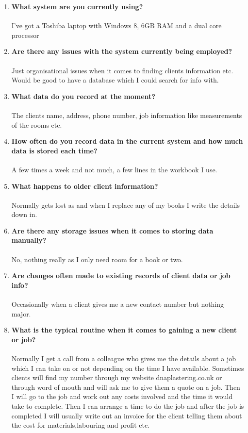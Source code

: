 \begin{enumerate}
\label{fig:interview}
	\item \textbf{What system are you currently using?}
		\\ \\ I've got a Toshiba laptop with Windows 8, 6GB RAM and a dual core processor
	\item \textbf{Are there any issues with the system currently being employed?}
		\\ \\Just organisational issues when it comes to finding clients information etc. Would be good to have a database which I could search for info with.
	\item \textbf{What data do you record at the moment?}
		\\ \\ The clients name, address, phone number, job information like measurements of the rooms etc.
	\item \textbf{How often do you record data in the current system and how much data is stored each time?}
		\\ \\ A few times a week and not much, a few lines in the workbook I use.
	\item \textbf{What happens to older client information?}
		\\ \\ Normally gets lost as and when I replace any of my books I write the details down in.
	\item \textbf{Are there any storage issues when it comes to storing data manually?}
		\\ \\ No, nothing really as I only need room for a book or two.
	\item \textbf{Are changes often made to existing records of client data or job info?}
		\\ \\ Occasionally when a client gives me a new contact number but nothing major.
	\item \textbf{What is the typical routine when it comes to gaining a new client or job?}
		\\ \\ Normally I get a call from a colleague who gives me the details about a job which I can take on or not depending on the time I have available. Sometimes clients will find my number through my website dnaplastering.co.uk or through word of mouth and will ask me to give them a quote on a job. Then I will go to the job and work out any costs involved and the time it would take to complete. Then I can arrange a time to do the job and after the job is completed I will usually write out an invoice for the client telling them about the cost for materials,labouring and profit etc.

\end{enumerate}
